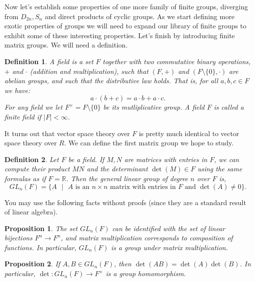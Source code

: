\documentclass[11pt]{article}
\newtheorem{proposition}{Proposition}
\newtheorem{definition}{Definition}
\newcommand{\bR}{\mathbb{R}}
\begin{document}
Now let's establish some properties of one more family of finite groups, diverging from $D_{2n},S_n$ and direct products of cyclic groups.  As we start defining more exotic properties of groups we will need to expand our library of finite groups to exhibit some of these interesting properties.  Let's finish by introducing finite matrix groups.  We will need a definition.
\begin{definition}
  A \textit{field} is a set $F$ together with two commutative binary operations, $+$ and $\cdot$ (addition and multiplication), such that $(F,+)$ and $(F\setminus\{0\},\cdot)$ are abelian groups, and such that the distributive law holds.  That is, for all $a,b,c\in F$ we have:
  \[a\cdot(b+c) = a\cdot b + a\cdot c.\]
  For any field we let $F^\times = F\setminus\{0\}$ be its \textit{mutliplicative group}.  A field $F$ is called a finite field if $|F|<\infty$.
\end{definition}
It turns out that vector space theory over $F$ is pretty much identical to vector space theory over $R$.  We can define the first matrix group we hope to study.
\begin{definition}
  Let $F$ be a field.  If $M,N$ are matrices with entries in $F$, we can compute their product $MN$ and the determinant $\det(M)\in F$ using the same formulas as if $F=\bR$.  Then the \textit{general linear group of degree} $n$ over $F$ is,
  \[GL_n(F) = \{A\text{ }|\text{ } A\text{ is an }n\times n\text{ matrix with entries in }F\text{ and }\det(A)\not=0\}.\]
\end{definition}
You may use the following facts without proofs (since they are a standard result of linear algebra).
\begin{proposition}
  The set $GL_n(F)$ can be identified with the set of linear bijections $F^n\to F^n$, and matrix multiplication corresponds to composition of functions.  In particular, $GL_n(F)$ is a group under matrix multiplication.
\end{proposition}
\begin{proposition}
  If $A,B\in GL_n(F)$, then $\det(AB)=\det(A)\det(B)$.  In particular, $\det:GL_n(F)\to F^\times$ is a group homomorphism.
\end{proposition}
\end{document}
